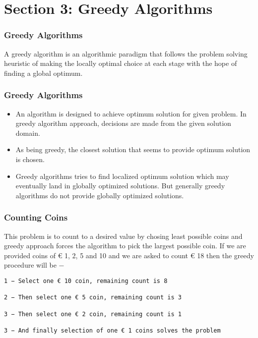 \documentclass{beamer}
\begin{document}
\section{Section 3: Greedy Algorithms}
\begin{frame}
\frametitle{Greedy Algorithms}
\large

A greedy algorithm is an algorithmic paradigm that follows the problem solving heuristic of making the locally optimal choice at each stage with the hope of finding a global optimum.
\end{frame}
\begin{frame}
\frametitle{Greedy Algorithms}
\large
\begin{itemize}
	\item An algorithm is designed to achieve optimum solution for given problem. In greedy algorithm approach, decisions are made from the given solution domain. 
	\item As being greedy, the closest solution that seems to provide optimum solution is chosen.
	
\item Greedy algorithms tries to find localized optimum solution which may eventually land in globally optimized solutions. But generally greedy algorithms do not provide globally optimized solutions.
\end{itemize}

\end{frame}
\begin{frame}[fragile]
\frametitle{Counting Coins}
This problem is to count to a desired value by chosing least possible coins and greedy approach forces the algorithm to pick the largest possible coin. If we are provided coins of € 1, 2, 5 and 10 and we are asked to count € 18 then the greedy procedure will be −

\begin{verbatim}
1 − Select one € 10 coin, remaining count is 8

2 − Then select one € 5 coin, remaining count is 3

3 − Then select one € 2 coin, remaining count is 1

3 − And finally selection of one € 1 coins solves the problem
\end{verbatim}
\end{frame}
\end{document}
